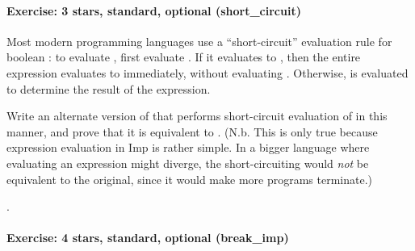 \documentclass[12pt]{report}
\begin{document}
\paragraph{Exercise: 3 stars, standard, optional (short\_circuit)}




    Most modern programming languages use a ``short-circuit'' evaluation
    rule for boolean : to evaluate   , first evaluate
    .  If it evaluates to , then the entire 
    expression evaluates to  immediately, without evaluating
    .  Otherwise,  is evaluated to determine the result of the
     expression.


    Write an alternate version of  that performs short-circuit
    evaluation of  in this manner, and prove that it is
    equivalent to .  (N.b. This is only true because expression
    evaluation in Imp is rather simple.  In a bigger language where
    evaluating an expression might diverge, the short-circuiting 
    would \textit{not} be equivalent to the original, since it would make more
    programs terminate.) 
\begin{coqdoccode}
\coqdocemptyline
\coqdocemptyline
\coqdocnoindent
{} .\coqdoceol
\end{coqdoccode}
\paragraph{Exercise: 4 stars, standard, optional (break\_imp)}
\end{document}
